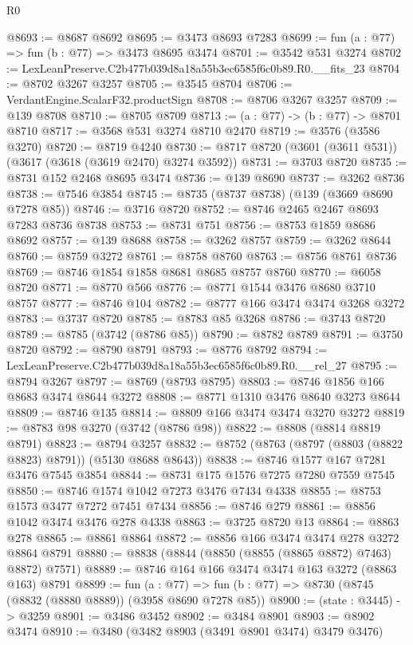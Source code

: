 \begin{lexlean}{R0}
\begin{coremodule}
@8693 := @8687 @8692
@8695 := @3473 @8693 @7283
@8699 := fun (a : @77) => fun (b : @77) => @3473 @8695 @3474
@8701 := @3542 @531 @3274
@8702 := LexLeanPreserve.C2b477b039d8a18a55b3ec6585f6c0b89.R0.__fits_23
@8704 := @8702 @3267 @3257
@8705 := @3545 @8704
@8706 := VerdantEngine.ScalarF32.productSign
@8708 := @8706 @3267 @3257
@8709 := @139 @8708
@8710 := @8705 @8709
@8713 := (a : @77) -> (b : @77) -> @8701 @8710
@8717 := @3568 @531 @3274 @8710 @2470
@8719 := @3576 (@3586 @3270)
@8720 := @8719 @4240
@8730 := @8717 @8720 (@3601 (@3611 @531)) (@3617 (@3618 (@3619 @2470) @3274 @3592))
@8731 := @3703 @8720
@8735 := @8731 @152 @2468 @8695 @3474
@8736 := @139 @8690
@8737 := @3262 @8736
@8738 := @7546 @3854
@8745 := @8735 (@8737 @8738) (@139 (@3669 @8690 @7278 @85))
@8746 := @3716 @8720
@8752 := @8746 @2465 @2467 @8693 @7283 @8736 @8738
@8753 := @8731 @751
@8756 := @8753 @1859 @8686 @8692
@8757 := @139 @8688
@8758 := @3262 @8757
@8759 := @3262 @8644
@8760 := @8759 @3272
@8761 := @8758 @8760
@8763 := @8756 @8761 @8736
@8769 := @8746 @1854 @1858 @8681 @8685 @8757 @8760
@8770 := @6058 @8720
@8771 := @8770 @566
@8776 := @8771 @1544 @3476 @8680 @3710 @8757
@8777 := @8746 @104
@8782 := @8777 @166 @3474 @3474 @3268 @3272
@8783 := @3737 @8720
@8785 := @8783 @85 @3268
@8786 := @3743 @8720
@8789 := @8785 (@3742 (@8786 @85))
@8790 := @8782 @8789
@8791 := @3750 @8720
@8792 := @8790 @8791
@8793 := @8776 @8792
@8794 := LexLeanPreserve.C2b477b039d8a18a55b3ec6585f6c0b89.R0.__rel_27
@8795 := @8794 @3267
@8797 := @8769 (@8793 @8795)
@8803 := @8746 @1856 @166 @8683 @3474 @8644 @3272
@8808 := @8771 @1310 @3476 @8640 @3273 @8644
@8809 := @8746 @135
@8814 := @8809 @166 @3474 @3474 @3270 @3272
@8819 := @8783 @98 @3270 (@3742 (@8786 @98))
@8822 := @8808 (@8814 @8819 @8791)
@8823 := @8794 @3257
@8832 := @8752 (@8763 (@8797 (@8803 (@8822 @8823) @8791)) (@5130 @8688 @8643))
@8838 := @8746 @1577 @167 @7281 @3476 @7545 @3854
@8844 := @8731 @175 @1576 @7275 @7280 @7559 @7545
@8850 := @8746 @1574 @1042 @7273 @3476 @7434 @4338
@8855 := @8753 @1573 @3477 @7272 @7451 @7434
@8856 := @8746 @279
@8861 := @8856 @1042 @3474 @3476 @278 @4338
@8863 := @3725 @8720 @13
@8864 := @8863 @278
@8865 := @8861 @8864
@8872 := @8856 @166 @3474 @3474 @278 @3272 @8864 @8791
@8880 := @8838 (@8844 (@8850 (@8855 (@8865 @8872) @7463) @8872) @7571)
@8889 := @8746 @164 @166 @3474 @3474 @163 @3272 (@8863 @163) @8791
@8899 := fun (a : @77) =>
  fun (b : @77) => @8730 (@8745 (@8832 (@8880 @8889)) (@3958 @8690 @7278 @85))
@8900 := (state : @3445) -> @3259
@8901 := @3486 @3452
@8902 := @3484 @8901
@8903 := @8902 @3474
@8910 := @3480 (@3482 @8903 (@3491 @8901 @3474) @3479 @3476)

\end{coremodule}
\end{lexlean}
